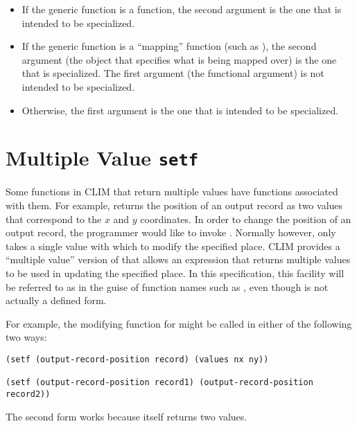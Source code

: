 \begin{itemize}
\item If the generic function is a  function, the second argument is
the one that is intended to be specialized.

\item If the generic function is a ``mapping'' function (such as
), the second argument (the object that
specifies what is being mapped over) is the one that is specialized.  The
first argument (the functional argument) is not intended to be specialized.

\item Otherwise, the first argument is the one that is intended to be
specialized.
\end{itemize}


\section {Multiple Value {\tt setf}}

Some functions in CLIM that return multiple values have  functions
associated with them.  For example,  returns the
position of an output record as two values that correspond to the $x$ and $y$
coordinates.  In order to change the position of an output record, the
programmer would like to invoke .  Normally
however,  only takes a single value with which to modify the specified
place.  CLIM provides a ``multiple value'' version of  that allows an
expression that returns multiple values to be used in updating the specified
place.  In this specification, this facility will be referred to as 
in the guise of function names such as , even
though  is not actually a defined form.

For example, the modifying function for  might be
called in either of the following two ways:

\begin{verbatim}
(setf (output-record-position record) (values nx ny))

(setf (output-record-position record1) (output-record-position record2))
\end{verbatim}

The second form works because  itself returns two
values.

